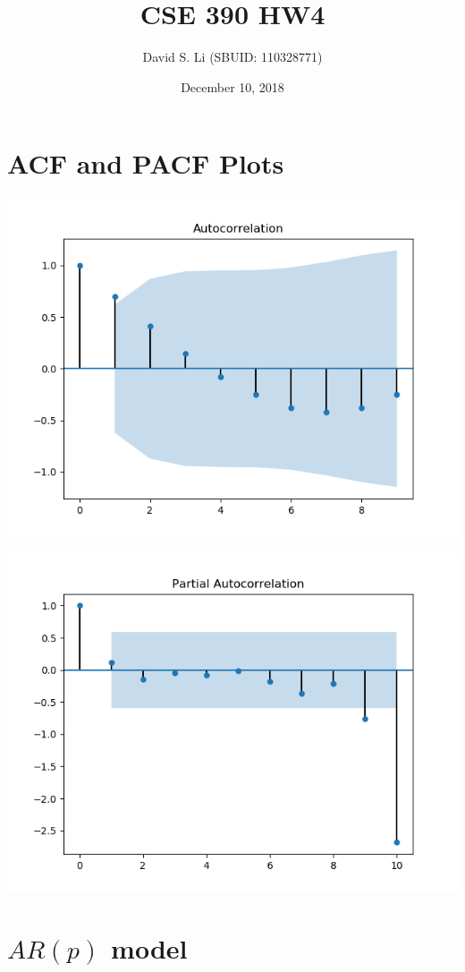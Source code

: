 \documentclass{article}
\title{CSE 390 HW4}
\author{David S. Li (SBUID: 110328771)}
\date{December 10, 2018}
\begin{document}
\maketitle

\section{ACF and PACF Plots}
\par\noindent\includegraphics{Figure_1.png}
\par\noindent\includegraphics{Figure_2.png}

\section{$AR(p)$ model}
\end{document}
